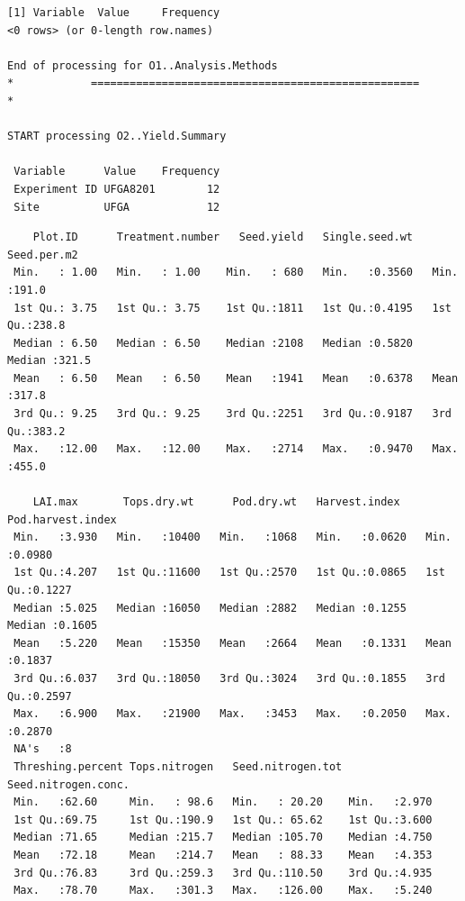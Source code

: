 \documentclass[
]{article}
\begin{document}
\begin{verbatim}
[1] Variable  Value     Frequency
<0 rows> (or 0-length row.names)

End of processing for O1..Analysis.Methods
*            ===================================================            *

START processing O2..Yield.Summary

 Variable      Value    Frequency
 Experiment ID UFGA8201        12
 Site          UFGA            12
\end{verbatim}

\begin{verbatim}
    Plot.ID      Treatment.number   Seed.yield   Single.seed.wt    Seed.per.m2   
 Min.   : 1.00   Min.   : 1.00    Min.   : 680   Min.   :0.3560   Min.   :191.0  
 1st Qu.: 3.75   1st Qu.: 3.75    1st Qu.:1811   1st Qu.:0.4195   1st Qu.:238.8  
 Median : 6.50   Median : 6.50    Median :2108   Median :0.5820   Median :321.5  
 Mean   : 6.50   Mean   : 6.50    Mean   :1941   Mean   :0.6378   Mean   :317.8  
 3rd Qu.: 9.25   3rd Qu.: 9.25    3rd Qu.:2251   3rd Qu.:0.9187   3rd Qu.:383.2  
 Max.   :12.00   Max.   :12.00    Max.   :2714   Max.   :0.9470   Max.   :455.0  
                                                                                 
    LAI.max       Tops.dry.wt      Pod.dry.wt   Harvest.index    Pod.harvest.index
 Min.   :3.930   Min.   :10400   Min.   :1068   Min.   :0.0620   Min.   :0.0980   
 1st Qu.:4.207   1st Qu.:11600   1st Qu.:2570   1st Qu.:0.0865   1st Qu.:0.1227   
 Median :5.025   Median :16050   Median :2882   Median :0.1255   Median :0.1605   
 Mean   :5.220   Mean   :15350   Mean   :2664   Mean   :0.1331   Mean   :0.1837   
 3rd Qu.:6.037   3rd Qu.:18050   3rd Qu.:3024   3rd Qu.:0.1855   3rd Qu.:0.2597   
 Max.   :6.900   Max.   :21900   Max.   :3453   Max.   :0.2050   Max.   :0.2870   
 NA's   :8                                                                        
 Threshing.percent Tops.nitrogen   Seed.nitrogen.tot Seed.nitrogen.conc.
 Min.   :62.60     Min.   : 98.6   Min.   : 20.20    Min.   :2.970      
 1st Qu.:69.75     1st Qu.:190.9   1st Qu.: 65.62    1st Qu.:3.600      
 Median :71.65     Median :215.7   Median :105.70    Median :4.750      
 Mean   :72.18     Mean   :214.7   Mean   : 88.33    Mean   :4.353      
 3rd Qu.:76.83     3rd Qu.:259.3   3rd Qu.:110.50    3rd Qu.:4.935      
 Max.   :78.70     Max.   :301.3   Max.   :126.00    Max.   :5.240      
                                                                        
\end{verbatim}
\end{document}
